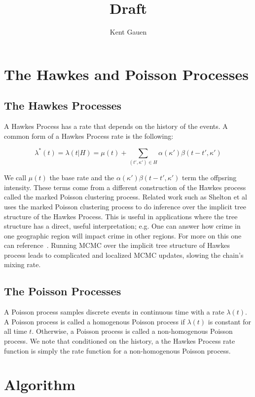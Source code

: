 \documentclass[11pt]{article}
\author{Kent Gauen}
\title{Draft}
\begin{document}
\maketitle

\section{The Hawkes and Poisson Processes}

\subsection{The Hawkes Processes}

\noindent A Hawkes Process has a rate that depends on the history of the events. A common form of a Hawkes Process rate is the following:

\[
  \lambda^*(t)
  =
  \lambda(t|H)
  =
  \mu(t)
  +
  \sum_{(t',\kappa')\in H}\alpha(\kappa')\beta(t-t',\kappa')
\]

\noindent We call $\mu(t)$ the base rate and the $\alpha(\kappa')\beta(t-t',\kappa')$ term the offpsring intensity. These terms come from a different construction of the Hawkes process called the marked Poisson clustering process. Related work such as Shelton et al~\cite{AAAI1816985} uses the marked Poisson clustering process to do inference over the implicit tree structure of the Hawkes Process. This is useful in applications where the tree structure has a direct, useful interpretation; e.g. One can answer how crime in one geographic region will impact crime in other regions. For more on this one can reference~\cite{Rasmussen2013}. Running MCMC over the implicit tree structure of Hawkes process leads to complicated and localized MCMC updates, slowing the chain's mixing rate.

\subsection{The Poisson Processes}

\noindent A Poisson process samples discrete events in continuous time with a rate $\lambda(t)$. A Poisson process is called a homogenous Poisson process if $\lambda(t)$ is constant for all time $t$. Otherwise, a Poisson process is called a non-homogenous Poisson process. We note that conditioned on the history, a the Hawkes Process rate function is simply the rate function for a non-homogenous Poisson process.

\section{Algorithm}
\end{document}
